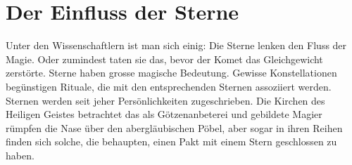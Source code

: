 \documentclass[12pt,twoside,twocolumn,openany]{book}
\begin{document}


\section{Der Einfluss der Sterne}
Unter den Wissenschaftlern ist man sich einig: Die Sterne lenken den Fluss der Magie. Oder zumindest taten sie das, bevor der Komet das Gleichgewicht zerstörte. Sterne haben grosse magische Bedeutung. Gewisse Konstellationen begünstigen Rituale, die mit den entsprechenden Sternen assoziiert werden. Sternen werden seit jeher Persönlichkeiten zugeschrieben. Die Kirchen des Heiligen Geistes betrachtet das als Götzenanbeterei und gebildete Magier rümpfen die Nase über den abergläubischen Pöbel, aber sogar in ihren Reihen finden sich solche, die behaupten, einen Pakt mit einem Stern geschlossen zu haben. 
\end{document}
